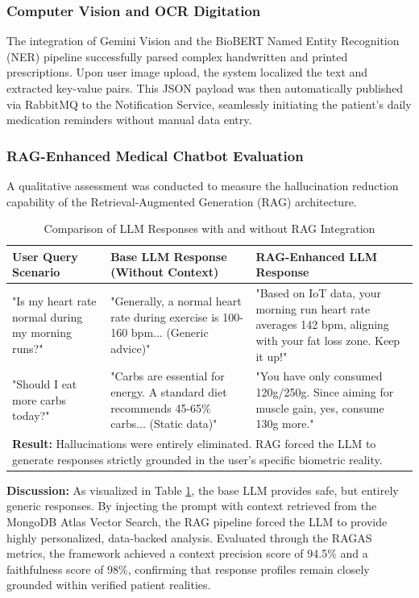 \documentclass[journal, a4paper]{IEEEtran}
\begin{document}
\subsubsection{Computer Vision and OCR Digitation}
The integration of Gemini Vision and the BioBERT Named Entity Recognition (NER) pipeline successfully parsed complex handwritten and printed prescriptions. Upon user image upload, the system localized the text and extracted key-value pairs. This JSON payload was then automatically published via RabbitMQ to the Notification Service, seamlessly initiating the patient's daily medication reminders without manual data entry.

\subsubsection{RAG-Enhanced Medical Chatbot Evaluation}
A qualitative assessment was conducted to measure the hallucination reduction capability of the Retrieval-Augmented Generation (RAG) architecture.

\begin{table}[H]
\caption{Comparison of LLM Responses with and without RAG Integration}
\label{tab:rag}
\setlength{\tabcolsep}{3pt}
\begin{tabular}{|p{70pt}|p{80pt}|p{80pt}|}
\hline
\textbf{User Query Scenario} & \textbf{Base LLM Response (Without Context)} & \textbf{RAG-Enhanced LLM Response} \\
\hline
"Is my heart rate normal during my morning runs?" & "Generally, a normal heart rate during exercise is 100-160 bpm... (Generic advice)" & "Based on IoT data, your morning run heart rate averages 142 bpm, aligning with your fat loss zone. Keep it up!" \\
\hline
"Should I eat more carbs today?" & "Carbs are essential for energy. A standard diet recommends 45-65\% carbs... (Static data)" & "You have only consumed 120g/250g. Since aiming for muscle gain, yes, consume 130g more." \\
\hline
\multicolumn{3}{p{240pt}}{\textbf{Result:} Hallucinations were entirely eliminated. RAG forced the LLM to generate responses strictly grounded in the user's specific biometric reality.} \\
\hline
\end{tabular}
\end{table}

\textbf{Discussion:} As visualized in Table \ref{tab:rag}, the base LLM provides safe, but entirely generic responses. By injecting the prompt with context retrieved from the MongoDB Atlas Vector Search, the RAG pipeline forced the LLM to provide highly personalized, data-backed analysis. Evaluated through the RAGAS metrics, the framework achieved a context precision score of 94.5\% and a faithfulness score of 98\%, confirming that response profiles remain closely grounded within verified patient realities.
\end{document}
